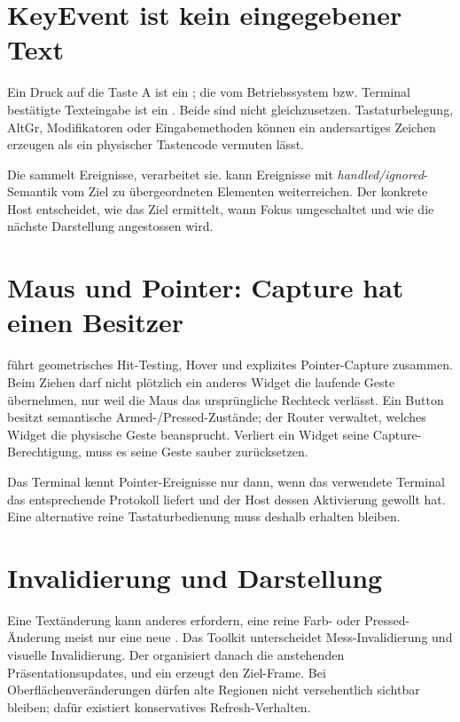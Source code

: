\section{KeyEvent ist kein eingegebener Text}
Ein Druck auf die Taste A ist ein
; die vom Betriebssystem bzw.
Terminal bestätigte Texteingabe ist ein
. Beide sind nicht
gleichzusetzen. Tastaturbelegung, AltGr,
Modifikatoren oder Eingabemethoden können
ein andersartiges Zeichen erzeugen als ein
physischer Tastencode vermuten lässt.

Die  sammelt Ereignisse,
 verarbeitet sie.
 kann Ereignisse mit
\emph{handled/ignored}-Semantik vom Ziel
zu übergeordneten Elementen weiterreichen.
Der konkrete Host entscheidet, wie das Ziel
ermittelt, wann Fokus umgeschaltet und
wie die nächste Darstellung angestossen wird.

\section{Maus und Pointer: Capture hat einen Besitzer}
 führt geometrisches Hit-Testing,
Hover und explizites Pointer-Capture zusammen.
Beim Ziehen darf nicht plötzlich ein anderes
Widget die laufende Geste übernehmen, nur weil
die Maus das ursprüngliche Rechteck verlässt.
Ein Button besitzt semantische Armed-/Pressed-Zustände;
der Router verwaltet, welches Widget die physische
Geste beansprucht. Verliert ein Widget seine
Capture-Berechtigung, muss es seine Geste sauber
zurücksetzen.

Das Terminal kennt Pointer-Ereignisse nur dann,
wenn das verwendete Terminal das entsprechende
Protokoll liefert und der Host dessen Aktivierung
gewollt hat. Eine alternative reine Tastaturbedienung
muss deshalb erhalten bleiben.

\section{Invalidierung und Darstellung}
Eine Textänderung kann anderes  erfordern,
eine reine Farb- oder Pressed-Änderung meist nur
eine neue .
Das Toolkit unterscheidet Mess-Invalidierung und
visuelle Invalidierung. Der 
organisiert danach die anstehenden Präsentationsupdates,
und ein  erzeugt den Ziel-Frame.
Bei Oberflächenveränderungen dürfen alte Regionen
nicht versehentlich sichtbar bleiben; dafür existiert
konservatives Refresh-Verhalten.


